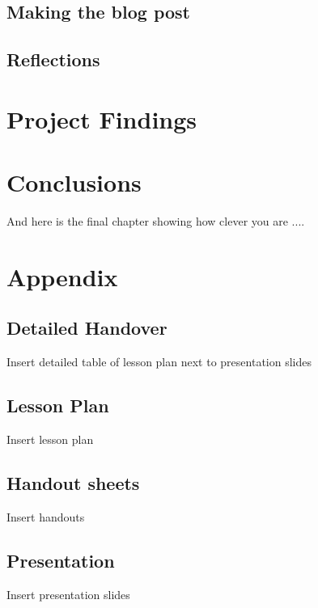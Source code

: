 \documentclass[12pt, a4paper,oneside]{book}
\numberwithin{equation}{section}
\begin{document}
\section{Making the blog post}\label{sec:x.x}


\section{Reflections}\label{sec:x.x}

\chapter{Project Findings}\label{ch:x}


\chapter{Conclusions}\label{ch:concl}
And here is the final chapter showing how clever you are ....



\appendix
\chapter{Appendix}

\section{Detailed Handover}\label{secx.x}

Insert detailed table of lesson plan next to presentation slides

\section{Lesson Plan}\label{secx.x}

Insert lesson plan

\section{Handout sheets}\label{secx.x}

Insert handouts

\section{Presentation}\label{secx.x}

Insert presentation slides
\end{document}

